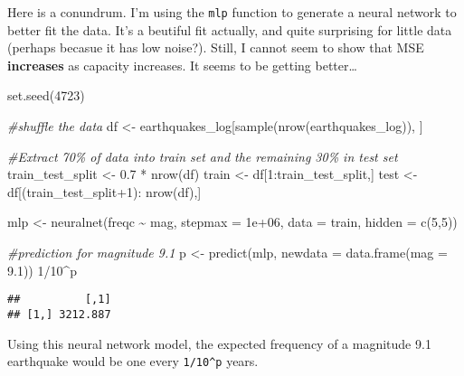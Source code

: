 \documentclass[
]{article}
\newenvironment{Shaded}{\begin{snugshade}}{\end{snugshade}}
\newcommand{\AttributeTok}[1]{\textcolor[rgb]{0.77,0.63,0.00}{#1}}
\newcommand{\CommentTok}[1]{\textcolor[rgb]{0.56,0.35,0.01}{\textit{#1}}}
\newcommand{\DecValTok}[1]{\textcolor[rgb]{0.00,0.00,0.81}{#1}}
\newcommand{\FloatTok}[1]{\textcolor[rgb]{0.00,0.00,0.81}{#1}}
\newcommand{\FunctionTok}[1]{\textcolor[rgb]{0.00,0.00,0.00}{#1}}
\newcommand{\NormalTok}[1]{#1}
\newcommand{\OtherTok}[1]{\textcolor[rgb]{0.56,0.35,0.01}{#1}}
\newcommand{\SpecialCharTok}[1]{\textcolor[rgb]{0.00,0.00,0.00}{#1}}
\begin{document}
Here is a conundrum. I'm using the \texttt{mlp} function to generate a
neural network to better fit the data. It's a beutiful fit actually, and
quite surprising for little data (perhaps becasue it has low noise?).
Still, I cannot seem to show that MSE \textbf{increases} as capacity
increases. It seems to be getting better\ldots{}

\begin{Shaded}
\begin{Highlighting}[]
\FunctionTok{set.seed}\NormalTok{(}\DecValTok{4723}\NormalTok{)}

\CommentTok{\#shuffle the data}
\NormalTok{df }\OtherTok{\textless{}{-}}\NormalTok{ earthquakes\_log[}\FunctionTok{sample}\NormalTok{(}\FunctionTok{nrow}\NormalTok{(earthquakes\_log)), ]}

\CommentTok{\#Extract 70\% of data into train set and the remaining 30\% in test set}
\NormalTok{train\_test\_split }\OtherTok{\textless{}{-}} \FloatTok{0.7} \SpecialCharTok{*} \FunctionTok{nrow}\NormalTok{(df)}
\NormalTok{train }\OtherTok{\textless{}{-}}\NormalTok{ df[}\DecValTok{1}\SpecialCharTok{:}\NormalTok{train\_test\_split,]}
\NormalTok{test }\OtherTok{\textless{}{-}}\NormalTok{ df[(train\_test\_split}\SpecialCharTok{+}\DecValTok{1}\NormalTok{)}\SpecialCharTok{:} \FunctionTok{nrow}\NormalTok{(df),]}

\NormalTok{mlp }\OtherTok{\textless{}{-}} \FunctionTok{neuralnet}\NormalTok{(freqc }\SpecialCharTok{\textasciitilde{}}\NormalTok{ mag,}
                 \AttributeTok{stepmax =} \FloatTok{1e+06}\NormalTok{,}
                 \AttributeTok{data =}\NormalTok{ train,}
                 \AttributeTok{hidden =} \FunctionTok{c}\NormalTok{(}\DecValTok{5}\NormalTok{,}\DecValTok{5}\NormalTok{))}

\CommentTok{\#prediction for magnitude 9.1}
\NormalTok{p }\OtherTok{\textless{}{-}} \FunctionTok{predict}\NormalTok{(mlp, }\AttributeTok{newdata =} \FunctionTok{data.frame}\NormalTok{(}\AttributeTok{mag =} \FloatTok{9.1}\NormalTok{))}
\DecValTok{1}\SpecialCharTok{/}\DecValTok{10}\SpecialCharTok{\^{}}\NormalTok{p}
\end{Highlighting}
\end{Shaded}

\begin{verbatim}
##          [,1]
## [1,] 3212.887
\end{verbatim}

Using this neural network model, the expected frequency of a magnitude
9.1 earthquake would be one every \texttt{1/10\^{}p} years.
\end{document}
